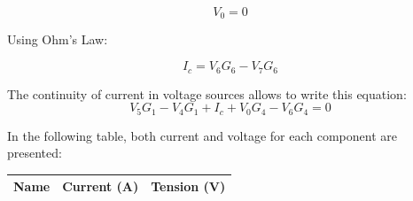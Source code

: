 \begin{equation}
    V_{0} = 0
\end{equation}


Using Ohm's Law:

\begin{equation}
    I_{c} = V_{6} G_{6} - V_{7} G_{6}
\end{equation}
\vspace{0.5cm}


The continuity of current in voltage sources allows to write this equation:
\begin{equation} 
    V_{5} G_{1} - V_{4} G_{1} + I_{c} + V_{0} G_{4} - V_{6} G_{4} = 0   
\end{equation}

In the following table, both current and voltage for each component are presented:
\begin{center}
\begin{tabular}{ |c|c|c| }
 \hline
\textbf{Name} & \textbf{Current (A)} & \textbf{Tension (V)} \\
 \hline
 
\end{tabular}
\end{center}

\pagebreak





